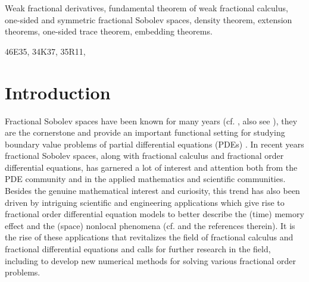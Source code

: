 \documentclass[leqno,final]{siamltex}
\numberwithin{equation}{section}
\renewcommand{\(}{\bigl(}
\renewcommand{\)}{\bigr)}
\begin{document}
\begin{keywords}
     Weak fractional derivatives,  fundamental theorem of weak fractional calculus,  one-sided and symmetric fractional Sobolev spaces, density theorem,  extension theorems,  one-sided trace theorem, embedding theorems. 
\end{keywords}

\begin{AMS}
    46E35, %
    34K37, %
    35R11, %
\end{AMS}


 


 

\section{Introduction}\label{sec-1}
Fractional Sobolev spaces have been known for many years 
	(cf. \cite{Adams,Brezis,Lions}, also see \cite{Nezza}), they are the cornerstone and provide 
	an important functional 
	setting for studying boundary value problems of partial differential equations (PDEs)  \cite{Evans,Trudinger,Lions}. 
%
    In recent years fractional Sobolev spaces, along with     
    fractional calculus and fractional order differential equations, has garnered a lot 
    of interest and attention both from the PDE community and in the applied mathematics 
    and scientific communities. Besides the genuine mathematical interest and curiosity, 
    this trend has also been driven by intriguing scientific and engineering applications which give rise to fractional order differential equation models to better describe the (time) 
     memory effect and the (space) nonlocal phenomena (cf. \cite{Caffarelli07,Du19, Guo,Hilfer,Kilbas, Meerschaert} and the references therein). It is the rise of these applications that revitalizes the field of fractional calculus and fractional differential equations and calls for further research in the field, including to develop new numerical methods for solving various fractional order problems. 
     
\end{document}
